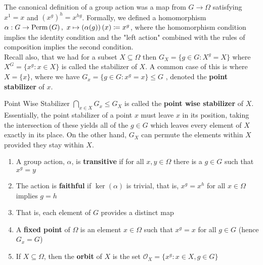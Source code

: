 \begin{recall}
	The canonical definition of a group action was 	a map from \(G \to \Omega\) satisfying \(x^{1}= x\) and \(\left( x^{g} \right)^{h}= x^{hg} \). Formally, we defined a homomorphism \(\alpha: G \to \operatorname{Perm} \left( G \right) , \ x \mapsto \left(\alpha(g)\right) \left( x \right) \coloneqq x^{g}\), where the homomorphism condition implies the identity condition and the "left action" combined with the rules of composition implies the second condition.\\
	Recall also, that we had for a subset \(X \subseteq \Omega\) then \(G_{X} = \{g \in G: X^{g} = X\} \) where \(X^{G} = \{x^{g}: x \in X\}  \) is called the  stabilizer of \(X\). A common case of this is where \(X = \{ x\} \), where we have \(G_{x} = \{g \in G : x^{g} = x\} \le G \) , denoted the \textbf{point stabilizer} of \(x\).
\end{recall}
\begin{note}{Point Wise Stabilizer}
	\(\bigcap_{x \in X}G_{x} \le G_{X}\) is called the \textbf{point wise stabilizer} of \(X\). Essentially, the point stabilizer of a point \(x\) must leave \(x\) in its position, taking the intersection of these yields all of the \(g \in G\) which leaves every element of \(X\) exactly in its place. On the other hand, \(G_{X}\) can permute the elements within \(X\) provided they stay within \(X\).
\end{note}
\begin{definition}
	\begin{enumerate}
		\item A group action, \(\alpha\), is \textbf{transitive} if for all \(x, y \in \Omega\) there is a \(g \in G\) such that \(x^{g} = y\)
		\item The action is \textbf{faithful} if \(\ker \left( \alpha \right) \) is trivial, that is, \(x^{g}= x^{h}\) for all \(x \in \Omega\) implies \(g = h\)
		\item That is, each element of \(G\) provides a distinct map
		\item A \textbf{fixed point} of \(\Omega\) is an element \(x \in \Omega\) such that \(x^{g}= x\) for all \(g \in G\) (hence \(G_{x}= G\))
		\item If \(X \subseteq \Omega\), then the \textbf{orbit} of \(X\) is the set \(\mathscr{O}_{X}= \{x^{g}: x \in X, g \in G\} \)
	\end{enumerate}
\end{definition}
